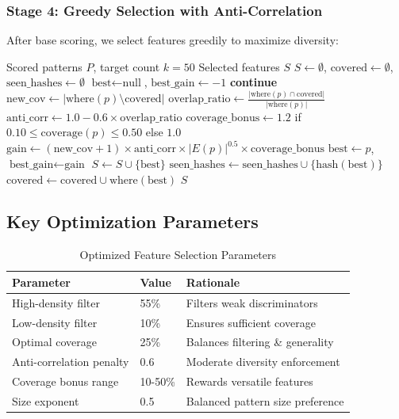 \documentclass[12pt,a4paper]{article}
\begin{document}
\subsubsection{Stage 4: Greedy Selection with Anti-Correlation}

After base scoring, we select features greedily to maximize diversity:

\begin{algorithm}[H]
\caption{Optimized Greedy Feature Selection}
\begin{algorithmic}[1]
\Require Scored patterns $P$, target count $k=50$
\Ensure Selected features $S$
\State $S \gets \emptyset$, $\text{covered} \gets \emptyset$, $\text{seen\_hashes} \gets \emptyset$
    \State $\text{best} \gets \text{null}$, $\text{best\_gain} \gets -1$
            \State \textbf{continue}
        \EndIf
        \State $\text{new\_cov} \gets |\text{where}(p) \setminus \text{covered}|$
        \State $\text{overlap\_ratio} \gets \frac{|\text{where}(p) \cap \text{covered}|}{|\text{where}(p)|}$
        \State $\text{anti\_corr} \gets 1.0 - 0.6 \times \text{overlap\_ratio}$
        \State $\text{coverage\_bonus} \gets 1.2$ if $0.10 \leq \text{coverage}(p) \leq 0.50$ else $1.0$
        \State $\text{gain} \gets (\text{new\_cov} + 1) \times \text{anti\_corr} \times |E(p)|^{0.5} \times \text{coverage\_bonus}$
            \State $\text{best} \gets p$, $\text{best\_gain} \gets \text{gain}$
        \EndIf
    \EndFor
    \State $S \gets S \cup \{\text{best}\}$
    \State $\text{seen\_hashes} \gets \text{seen\_hashes} \cup \{\text{hash}(\text{best})\}$
    \State $\text{covered} \gets \text{covered} \cup \text{where}(\text{best})$
\EndFor
\State \Return $S$
\end{algorithmic}
\end{algorithm}

\subsection{Key Optimization Parameters}

\begin{table}[H]
\centering
\begin{tabular}{lll}
\toprule
\textbf{Parameter} & \textbf{Value} & \textbf{Rationale} \\
\midrule
High-density filter & 55\% & Filters weak discriminators \\
Low-density filter & 10\% & Ensures sufficient coverage \\
Optimal coverage & 25\% & Balances filtering \& generality \\
Anti-correlation penalty & 0.6 & Moderate diversity enforcement \\
Coverage bonus range & 10-50\% & Rewards versatile features \\
Size exponent & 0.5 & Balanced pattern size preference \\
\bottomrule
\end{tabular}
\caption{Optimized Feature Selection Parameters}
\end{table}
\end{document}
